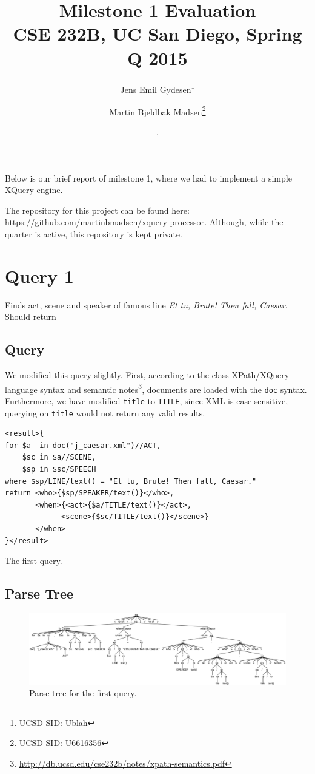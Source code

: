 \documentclass{article}
\title{Milestone 1 Evaluation\\
{\small CSE 232B, UC San Diego, Spring Q 2015}}
\author{Jens Emil Gydesen\thanks{UCSD SID: Ublah} \and
        Martin Bjeldbak Madsen\thanks{UCSD SID: U6616356}}
\date{\DTMdisplaydate{2015}{5}{13}{3}, \DTMdisplaytime{11}{10}{00}}
\begin{document}
\maketitle

Below is our brief report of milestone 1, where we had to implement a simple XQuery engine.

The repository for this project can be found here: \url{https://github.com/martinbmadsen/xquery-processor}. Although, while the quarter is active, this repository is kept private.

\section{Query 1}
Finds act, scene and speaker of famous line \emph{Et tu, Brute! Then fall, Caesar}. Should return 


\subsection{Query}\label{sec:query1query}
We modified this query slightly. First, according to the class XPath/XQuery language syntax and semantic notes\footnote{\url{http://db.ucsd.edu/cse232b/notes/xpath-semantics.pdf}}, documents are loaded with the \texttt{doc} syntax. Furthermore, we have modified \texttt{title} to \texttt{TITLE}, since XML is case-sensitive, querying on \texttt{title} would not return any valid results.

\begin{listing}[H]
\begin{verbatim}
<result>{
for $a  in doc("j_caesar.xml")//ACT,
    $sc in $a//SCENE,
    $sp in $sc/SPEECH
where $sp/LINE/text() = "Et tu, Brute! Then fall, Caesar."
return <who>{$sp/SPEAKER/text()}</who>,
       <when>{<act>{$a/TITLE/text()}</act>,
             <scene>{$sc/TITLE/text()}</scene>}
       </when>
}</result>
\end{verbatim}
\caption{The first query.}\label{lst:query1}
\end{listing}

\subsection{Parse Tree}
\begin{figure}[H]
  \centering
  \includegraphics[width=\linewidth]{imgs/antlr4_parse_tree_query_1.png}
  \caption{Parse tree for the first query.}\label{fig:parseTree1}
\end{figure}
\end{document}
